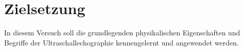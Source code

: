 \section{Zielsetzung}
In diesem Versuch soll die grundlegenden physikalischen Eigenschaften und Begriffe der Ultraschallechographie kennengelernt und angewendet werden.
\label{sec:Zielsetzung}